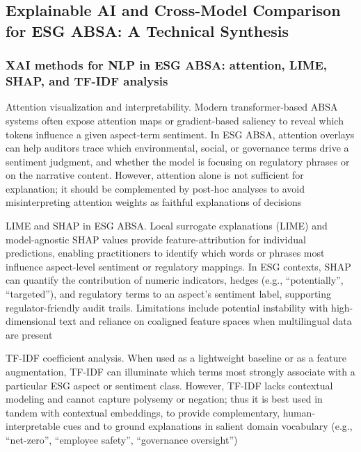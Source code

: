 \subsection{Explainable AI and Cross-Model Comparison for ESG ABSA: A Technical Synthesis}

\subsubsection{XAI methods for NLP in ESG ABSA: attention, LIME, SHAP, and TF-IDF analysis}

Attention visualization and interpretability. Modern transformer-based ABSA systems often expose attention maps or gradient-based saliency to reveal which tokens influence a given aspect-term sentiment. In ESG ABSA, attention overlays can help auditors trace which environmental, social, or governance terms drive a sentiment judgment, and whether the model is focusing on regulatory phrases or on the narrative content. However, attention alone is not sufficient for explanation; it should be complemented by post-hoc analyses to avoid misinterpreting attention weights as faithful explanations of decisions \cite{10.1145/3503044,10.1111/1475-679x.12575,10.3390/su11041093}

LIME and SHAP in ESG ABSA. Local surrogate explanations (LIME) and model-agnostic SHAP values provide feature-attribution for individual predictions, enabling practitioners to identify which words or phrases most influence aspect-level sentiment or regulatory mappings. In ESG contexts, SHAP can quantify the contribution of numeric indicators, hedges (e.g., “potentially”, “targeted”), and regulatory terms to an aspect’s sentiment label, supporting regulator-friendly audit trails. Limitations include potential instability with high-dimensional text and reliance on coaligned feature spaces when multilingual data are present \cite{10.1002/csr.70089,10.2139/ssrn.3738629,10.1108/mf-01-2023-0020}

TF-IDF coefficient analysis. When used as a lightweight baseline or as a feature augmentation, TF-IDF can illuminate which terms most strongly associate with a particular ESG aspect or sentiment class. However, TF-IDF lacks contextual modeling and cannot capture polysemy or negation; thus it is best used in tandem with contextual embeddings, to provide complementary, human-interpretable cues and to ground explanations in salient domain vocabulary (e.g., “net-zero”, “employee safety”, “governance oversight”) \cite{10.1145/3503044,10.1111/reel.12554}

